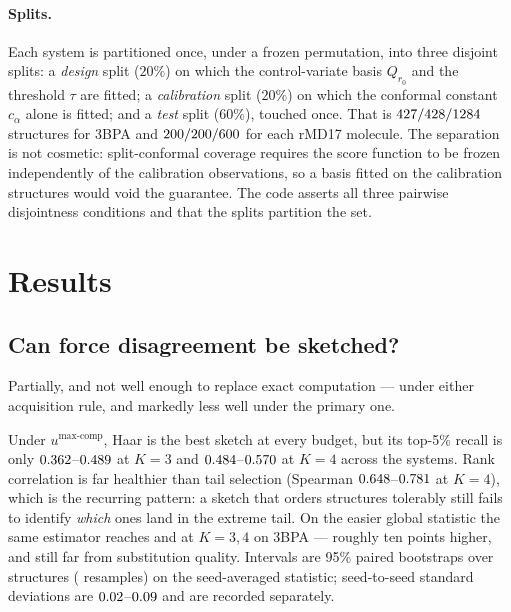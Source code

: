 \documentclass{article}
\begin{document}
\paragraph{Splits.}
Each system is partitioned once, under a frozen permutation, into three disjoint splits: a
\emph{design} split ($20\%$) on which the control-variate basis $Q_{r_0}$ and the threshold $\tau$
are fitted; a \emph{calibration} split ($20\%$) on which the conformal constant $c_\alpha$ alone is
fitted; and a \emph{test} split ($60\%$), touched once. That is
$427/428/1284$ structures for 3BPA and
$200/200/600$ for each rMD17 molecule. The separation is not
cosmetic: split-conformal coverage requires the score function to be frozen independently of the
calibration observations, so a basis fitted on the calibration structures would void the guarantee.
The code asserts all three pairwise disjointness conditions and that the splits partition the set.

\section{Results}

\subsection{Can force disagreement be sketched?}
\label{sec:fidelity}
Partially, and not well enough to replace exact computation --- under either acquisition rule, and
markedly less well under the primary one.

Under $u^{\max\text{-comp}}$, Haar is the best sketch at every budget, but its top-5\% recall is only
$0.362$--$0.489$ at $K{=}3$ and
$0.484$--$0.570$ at $K{=}4$ across the \fsMaxNSystems{} systems. Rank
correlation is far healthier than tail selection (Spearman
$0.648$--$0.781$ at $K{=}4$), which is the recurring pattern: a
sketch that orders structures tolerably still fails to identify \emph{which} ones land in the
extreme tail. On the easier global statistic the same estimator reaches \fsHaarRecallKThree{}
\fsHaarRecallKThreeCI{} and \fsHaarRecallKFour{} \fsHaarRecallKFourCI{} at $K{=}3,4$ on 3BPA ---
roughly ten points higher, and still far from substitution quality. Intervals are 95\% paired
bootstraps over structures (\fsNBoot{} resamples) on the seed-averaged statistic; seed-to-seed
standard deviations are $0.02$--$0.09$ and are recorded separately.
\end{document}
